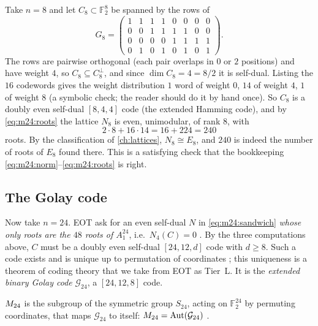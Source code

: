 \begin{example}\label{exa:m24:hamming}
Take $n=8$ and let $C_8\subset\mathbb F_2^8$ be spanned by the rows of
\[
 G_8=\begin{pmatrix}1&1&1&1&0&0&0&0\\0&0&1&1&1&1&0&0\\0&0&0&0&1&1&1&1\\0&1&0&1&0&1&0&1\end{pmatrix}.
\]
The rows are pairwise orthogonal (each pair overlaps in $0$ or $2$ positions) and have weight
$4$, so $C_8\subseteq C_8^\perp$, and since $\dim C_8=4=8/2$ it is self-dual. Listing the
$16$ codewords gives the weight distribution $1$ word of weight $0$, $14$ of weight $4$, $1$
of weight $8$ (a symbolic check; the reader should do it by hand once). So $C_8$ is a doubly
even self-dual $[8,4,4]$ code (the extended Hamming code), and by
\eqref{eq:m24:roots} the lattice $N_8$ is even, unimodular, of rank $8$, with
\[
 2\cdot8+16\cdot14=16+224=240
\]
roots. By the classification of \cref{ch:lattices}, $N_8\cong E_8$, and $240$ is indeed the
number of roots of $E_8$ found there. This is a satisfying check that the bookkeeping
\eqref{eq:m24:norm}--\eqref{eq:m24:roots} is right.
\end{example}

\subsection*{The Golay code}
Now take $n=24$. EOT ask for an even self-dual $N$ in \eqref{eq:m24:sandwich} \emph{whose only
roots are the $48$ roots of $A_1^{24}$}, i.e.\ $N_4(C)=0$ .
By the three computations above, $C$ must be a doubly even self-dual $[24,12,d]$ code with
$d\ge8$. Such a code exists and is unique up to permutation of coordinates
; this uniqueness is a theorem of coding theory that we take
from EOT as Tier~L. It is the \emph{extended binary Golay code}
$\mathcal G_{24}$, a $[24,12,8]$ code.

\begin{definition}[$\Mtf$]\label{def:m24:M24}
$\Mtf$ is the subgroup of the symmetric group $S_{24}$, acting on $\mathbb F_2^{24}$ by
permuting coordinates, that maps $\mathcal G_{24}$ to itself: $M_{24}=\operatorname{Aut}(\mathcal
G_{24})$ .
\end{definition}

